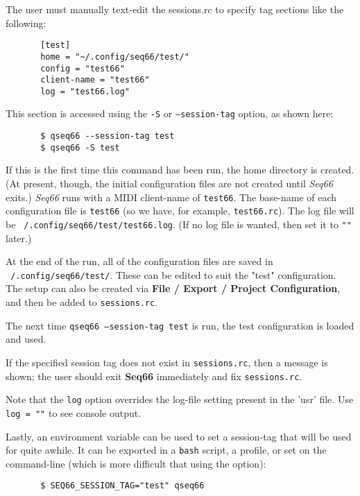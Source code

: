   The user must manually text-edit the sessions.rc to specify tag
   sections like the following:

   \begin{verbatim}
       [test]
       home = "~/.config/seq66/test/"
       config = "test66"
       client-name = "test66"
       log = "test66.log"
   \end{verbatim}

   This section is accessed using the \texttt{-S} or
   \texttt{--session-tag} option, as shown here:

   \begin{verbatim}
       $ qseq66 --session-tag test
       $ qseq66 -S test
   \end{verbatim}

   If this is the first time this command has been run, the
   home directory is created.
   (At present, though, the initial configuration files are not
   created until \textsl{Seq66} exits.)
   \textsl{Seq66} runs with a MIDI client-name of
   \texttt{test66}.
   The base-name of each configuration file
   is \texttt{test66} (so we have, for example, \texttt{test66.rc}).
   The log file will be
   \texttt{~/.config/seq66/test/test66.log}.
   (If no log file is wanted, then set it to \texttt{""} later.)

   At the end of the run, all of the configuration files are
   saved in 
   \texttt{~/.config/seq66/test/}.
   These can be edited to suit the "test" configuration.
   The setup can also be created via
   \textbf{File / Export / Project Configuration},
   and then be added to \texttt{sessions.rc}.

   The next time 
   \texttt{qseq66 --session-tag test}
   is run, the test configuration is loaded and used.

   If the specified session tag does not exist in \texttt{sessions.rc},
   then a message is shown; the user should exit \textbf{Seq66} immediately
   and fix \texttt{sessions.rc}.

   Note that the \texttt{log} option overrides the log-file setting
   present in the 'usr' file. Use \texttt{log = ""} to see console output.

   Lastly, an environment variable can be used to set a session-tag that
   will be used for quite awhile.
   It can be exported in a \texttt{bash} script, a profile,
   or set on the command-line (which is more difficult that using the
   option):

   \begin{verbatim}
       $ SEQ66_SESSION_TAG="test" qseq66
   \end{verbatim}


